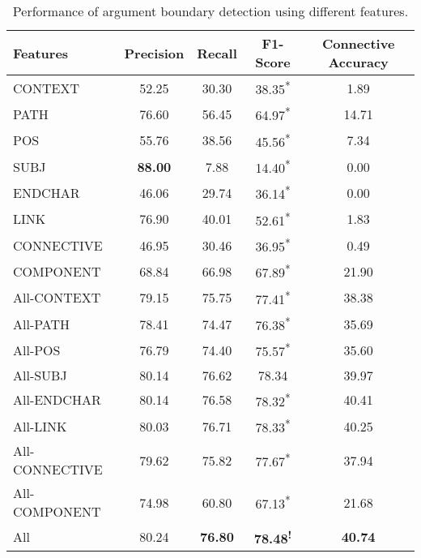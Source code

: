 \begin{table}[ht]
\centering
\begin{tabular}{|l|c|c|c|c|}
\hline

    Features        &     Precision &     Recall &     F1-Score                 &     Connective Accuracy \\ \hline
    CONTEXT         &     52.25     &     30.30  &     38.35\textsuperscript{*} &      1.89               \\ \hline
    PATH            &     76.60     &     56.45  &     64.97\textsuperscript{*} &     14.71               \\ \hline
    POS             &     55.76     &     38.56  &     45.56\textsuperscript{*} &      7.34               \\ \hline
    SUBJ            & \bf 88.00     &      7.88  &     14.40\textsuperscript{*} &      0.00               \\ \hline
    ENDCHAR         &     46.06     &     29.74  &     36.14\textsuperscript{*} &      0.00               \\ \hline
    LINK            &     76.90     &     40.01  &     52.61\textsuperscript{*} &      1.83               \\ \hline
    CONNECTIVE      &     46.95     &     30.46  &     36.95\textsuperscript{*} &      0.49               \\ \hline
    COMPONENT       &     68.84     &     66.98  &     67.89\textsuperscript{*} &     21.90               \\ \hline
    All-CONTEXT     &     79.15     &     75.75  &     77.41\textsuperscript{*} &     38.38               \\ \hline
    All-PATH        &     78.41     &     74.47  &     76.38\textsuperscript{*} &     35.69               \\ \hline
    All-POS         &     76.79     &     74.40  &     75.57\textsuperscript{*} &     35.60               \\ \hline
    All-SUBJ        &     80.14     &     76.62  &     78.34\textsuperscript{ } &     39.97               \\ \hline
    All-ENDCHAR     &     80.14     &     76.58  &     78.32\textsuperscript{*} &     40.41               \\ \hline
    All-LINK        &     80.03     &     76.71  &     78.33\textsuperscript{*} &     40.25               \\ \hline
    All-CONNECTIVE  &     79.62     &     75.82  &     77.67\textsuperscript{*} &     37.94               \\ \hline
    All-COMPONENT   &     74.98     &     60.80  &     67.13\textsuperscript{*} &     21.68               \\ \hline
    All             &     80.24     & \bf 76.80  & \bf 78.48\textsuperscript{!} & \bf 40.74               \\ \hline

\end{tabular}
\caption{\label{t:argument-features} Performance of argument boundary detection
using different features. }
\end{table}
